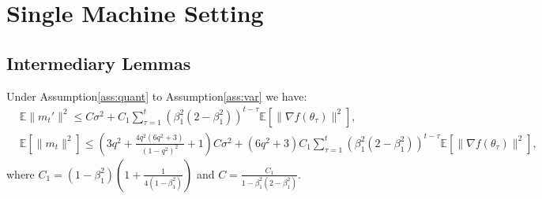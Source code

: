 \documentclass[11pt]{article}
\begin{document}
\newpage



\newpage
\appendix 


\section{Single Machine Setting}


\subsection{Intermediary Lemmas}



\begin{Lemma} \label{lemma:m_t,m_t'}
Under Assumption\ref{ass:quant} to Assumption\ref{ass:var} we have:
\begin{align*}
    &\mathbb E\|m_t'\|^2\leq C\sigma^2+C_1 \sum_{\tau=1}^t (\beta_1^2(2-\beta_1^2))^{t-\tau}\mathbb E[\|\nabla f(\theta_\tau)\|^2],\\
    &\mathbb E[\|m_t\|^2]\leq (3q^2+\frac{4q^2(6q^2+3)}{(1-q^2)^2}+1)C\sigma^2+(6q^2+3)C_1\sum_{\tau=1}^t (\beta_1^2(2-\beta_1^2))^{t-\tau}\mathbb E[\|\nabla f(\theta_\tau)\|^2],
\end{align*}
where $C_1=(1-\beta_1^2)(1+\frac{1}{4(1-\beta_1^2)})$ and $C=\frac{C_1}{1-\beta_1^2(2-\beta_1^2)}$.
\end{Lemma}
\end{document}
